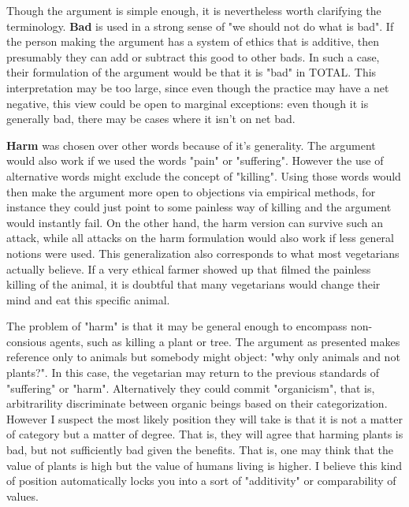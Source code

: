 \documentclass[12pt]{report}
\numberwithin{equation}{section}
\begin{document}
Though the argument is simple enough, it is nevertheless worth clarifying the terminology. \textbf{Bad} is used in a strong sense of "we should not do what is bad". If the person making the argument has a system of ethics that is additive, then presumably they can add or subtract this good to other bads. In such a case, their formulation of the argument would be that it is "bad" in TOTAL. This interpretation may be too large, since even though the practice may have a net negative, this view could be open to marginal exceptions: even though it is generally bad, there may be cases where it isn't on net bad. 

\textbf{Harm} was chosen over other words because of it's generality. The argument would also work if we used the words "pain" or "suffering". However the use of alternative words might exclude the concept of "killing". Using those words would then make the argument more open to objections via empirical methods, for instance they could just point to some painless way of killing and the argument would instantly fail. On the other hand, the harm version can survive such an attack, while all attacks on the harm formulation would also work if less general notions were used. This generalization also corresponds to what most vegetarians actually believe. If a very ethical farmer showed up that filmed the painless killing of the animal, it is doubtful that many vegetarians would change their mind and eat this specific animal. 

The problem of "harm" is that it may be general enough to encompass non-consious agents, such as killing a plant or tree. The argument as presented makes reference only to animals but somebody might object: "why only animals and not plants?". In this case, the vegetarian may return to the previous standards of "suffering" or "harm". Alternatively they could commit "organicism", that is, arbitrarility discriminate between organic beings based on their categorization. However I suspect the most likely position they will take is that it is not a matter of category but a matter of degree. That is, they will agree that harming plants is bad, but not sufficiently bad given the benefits. That is, one may think that the value of plants is high but the value of humans living is higher. I believe this kind of position automatically locks you into a sort of  "additivity" or comparability of values. 


\end{document}
